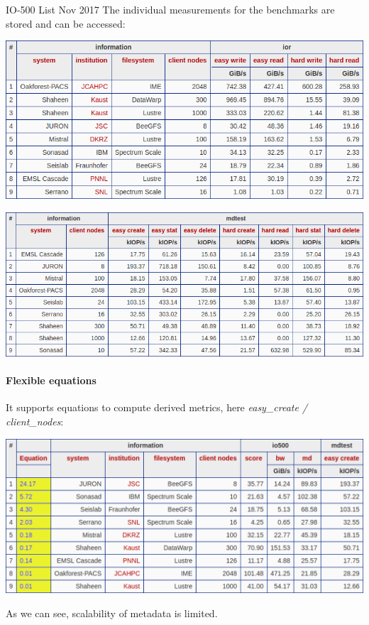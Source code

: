 \documentclass[portrait,a0paper,fontscale=0.4]{baposter}
\begin{document}
\begin{poster}
\begin{posterbox}[name=io500res,column=1,above=bottom,below=io500]{IO-500 List Nov 2017}
The individual measurements for the benchmarks are stored and can be accessed:

\includegraphics[width=\textwidth]{io500-benchmarks}

\includegraphics[width=\textwidth]{io500-benchmarks-mdtest}

\vspace*{-1em}

\paragraph{Flexible equations}

It supports equations to compute derived metrics, here \textit{easy\_create / client\_nodes}:

\includegraphics[width=\textwidth]{io500-sorted}

As we can see, scalability of metadata is limited.


\end{posterbox}
\end{poster}
\end{document}
